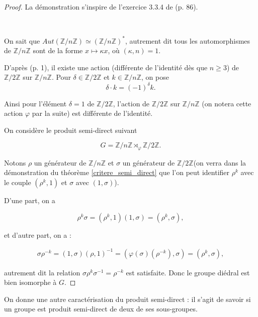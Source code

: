 \documentclass[french]{report}
\begin{document}
\begin{proof}
  La démonstration s'inspire de l'exercice 3.3.4 de \cite{theorie_groupes} (p. 86).

  \

  On sait que $Aut(\mathbb{Z}/{ n }\mathbb{Z}) \simeq (\mathbb{Z}/{ n }\mathbb{Z}) ^{*}$, autrement dit tous les automorphismes de $\mathbb{Z}/{ n }\mathbb{Z}$ sont de la forme $x \mapsto \kappa x$, où $(\kappa, n) = 1$.

  D'après \cite{lyon} (p. 1), il existe une action (différente de l'identité dès que $n \geq 3$) de $\mathbb{Z}/{ 2 }\mathbb{Z}$ sur $\mathbb{Z}/{ n }\mathbb{Z}$. Pour $\delta  \in \mathbb{Z}/{ 2 }\mathbb{Z}$ et $k \in \mathbb{Z}/{ n }\mathbb{Z}$, on pose $$ \delta \cdot k = (-1) ^{\delta } k.$$

  Ainsi pour l'élément $\delta =1$ de $\mathbb{Z}/{ 2 }\mathbb{Z}$, l'action de $\mathbb{Z}/{ 2 }\mathbb{Z}$ sur $\mathbb{Z}/{ n }\mathbb{Z}$ (on notera cette action $\varphi$ par la suite) est différente de l'identité.

  On considère le produit semi-direct suivant

  $$ G = \mathbb{Z}/{ n }\mathbb{Z} \rtimes _{\varphi} \mathbb{Z}/{ 2 }\mathbb{Z}. $$

  Notons $\rho$ un générateur de $\mathbb{Z}/{ n }\mathbb{Z}$ et $\sigma$ un générateur de $\mathbb{Z}/{ 2 }\mathbb{Z}$(on verra dans la démonstration du théorème \ref{critere_semi_direct} que l'on peut identifier $\rho ^{k}$ avec le couple $(\rho ^{k}, 1)$ et $\sigma$ avec $(1, \sigma)$).

  D'une part, on  a

  $$ \rho ^{k} \sigma = (\rho ^{k}, 1)(1, \sigma) = (\rho ^{k}, \sigma),  $$

  et d'autre part, on a :

  \begin{gather*}
    \sigma \rho ^{-k} = (1, \sigma)(\rho, 1) ^{-1}  = (\varphi(\sigma)(\rho ^{-k}), \sigma  )= (\rho ^{k}, \sigma),
  \end{gather*}

  autrement dit la relation $\sigma \rho ^{k} \sigma ^{-1}  = \rho ^{-k}$ est satisfaite. Donc le groupe diédral est bien isomorphe à $G$.


\end{proof}

On donne une autre caractérisation du produit semi-direct : il s'agit de savoir si un groupe est produit semi-direct de deux de ses sous-groupes.
\end{document}
